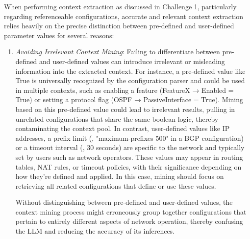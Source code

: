 When performing context extraction as discussed in Challenge 1, particularly regarding referenceable configurations, accurate and relevant context extraction relies heavily on the precise distinction between pre-defined and user-defined parameter values for several reasons:
\begin{enumerate}
    \item \textit{Avoiding Irrelevant Context Mining}: Failing to differentiate between pre-defined and user-defined values can introduce irrelevant or misleading information into the extracted context.
    For instance, a pre-defined value like True is universally recognized by the configuration parser and could be used in multiple contexts, such as enabling a feature (FeatureX → Enabled = True) or setting a protocol flag (OSPF → PassiveInterface = True). Mining based on this pre-defined value could lead to irrelevant results, pulling in unrelated configurations that share the same boolean logic, thereby contaminating the context pool.
    In contrast, user-defined values like IP addresses, a prefix limit (\eg, "maximum-prefixes 500" in a BGP configuration) or a timeout interval (\eg, 30 seconds) are specific to the network and typically set by users such as network operators. These values may appear in routing tables, NAT rules, or timeout policies, with their significance depending on how they’re defined and applied. In this case, mining should focus on retrieving all related configurations that define or use these values.
    
    
    Without distinguishing between pre-defined and user-defined values, the context mining process might erroneously group together configurations that pertain to entirely different aspects of network operation, thereby confusing the LLM and reducing the accuracy of its inferences.


\end{enumerate}
